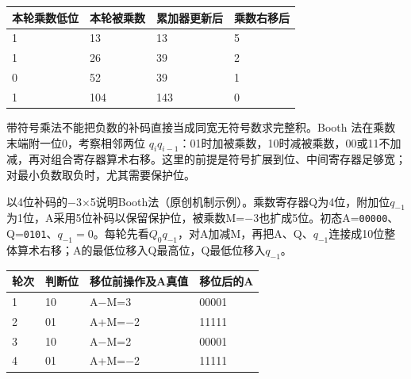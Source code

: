 \begin{wideblock}\par\medskip\noindent\begin{minipage}{\linewidth}\fontsize{9.3}{12}\selectfont\begin{tabularx}{\linewidth}{@{}YYYY@{}}
\toprule\noalign{}
本轮乘数低位 & 本轮被乘数 & 累加器更新后 & 乘数右移后 \\
\midrule\noalign{}


1 & 13 & 13 & 5 \\
1 & 26 & 39 & 2 \\
0 & 52 & 39 & 1 \\
1 & 104 & 143 & 0 \\
\bottomrule\end{tabularx}
\end{minipage}\par\medskip\end{wideblock}

带符号乘法不能把负数的补码直接当成同宽无符号数求完整积。Booth 法在乘数末端附一位0，考察相邻两位 \(q_iq_{i-1}\)：01时加被乘数，10时减被乘数，00或11不加减，再对组合寄存器算术右移。这里的前提是符号扩展到位、中间寄存器足够宽；对最小负数取负时，尤其需要保护位。

以4位补码的\ensuremath{-}3\ensuremath{\times}5说明Booth法（原创机制示例）。乘数寄存器Q为4位，附加位\(q_{-1}\)为1位，A采用5位补码以保留保护位，被乘数M=\ensuremath{-}3也扩成5位。初态A=\texttt{00000}、Q=\texttt{0101}、\(q_{-1}=0\)。每轮先看\(Q_0q_{-1}\)，对A加减M，再把A、Q、\(q_{-1}\)连接成10位整体算术右移；A的最低位移入Q最高位，Q最低位移入\(q_{-1}\)。

\begin{wideblock}\par\medskip\noindent\begin{minipage}{\linewidth}\fontsize{9.3}{12}\selectfont\begin{tabularx}{\linewidth}{@{}YYYY@{}}
\toprule\noalign{}
轮次 & 判断位 & 移位前操作及A真值 & 移位后的A \\
\midrule\noalign{}


1 & 10 & A\ensuremath{-}M=3 & 00001 \\
2 & 01 & A+M=\ensuremath{-}2 & 11111 \\
3 & 10 & A\ensuremath{-}M=2 & 00001 \\
4 & 01 & A+M=\ensuremath{-}2 & 11111 \\
\bottomrule\end{tabularx}
\end{minipage}\par\medskip\end{wideblock}

